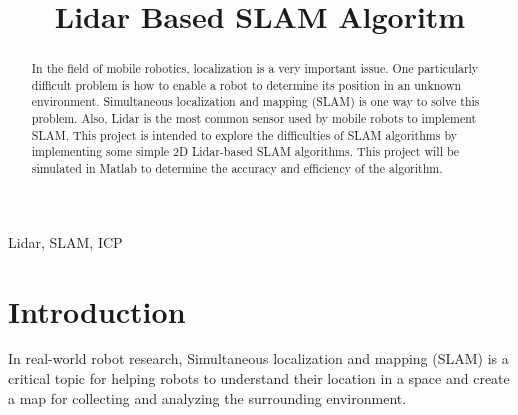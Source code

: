 \documentclass[conference]{IEEEtran}
\begin{document}
\title{Lidar Based SLAM Algoritm\\
}

\author{
\and
{}
\and
{}
}

\maketitle

\begin{abstract}
In the field of mobile robotics, localization is a very important issue. One particularly difficult problem is how to enable a robot to determine its position in an unknown environment. Simultaneous localization and mapping (SLAM) is one way to solve this problem. Also, Lidar is the most common sensor used by mobile robots to implement SLAM. This project is intended to explore the difficulties of SLAM algorithms by implementing some simple 2D Lidar-based SLAM algorithms. This project will be simulated in Matlab to determine the accuracy and efficiency of the algorithm.
\end{abstract}

\begin{IEEEkeywords}
Lidar, SLAM, ICP
\end{IEEEkeywords}

\section{Introduction}
In real-world robot research, Simultaneous localization and mapping (SLAM) is a critical topic for helping robots to understand their location in a space and create a map for collecting and analyzing the surrounding environment. 
\end{document}
